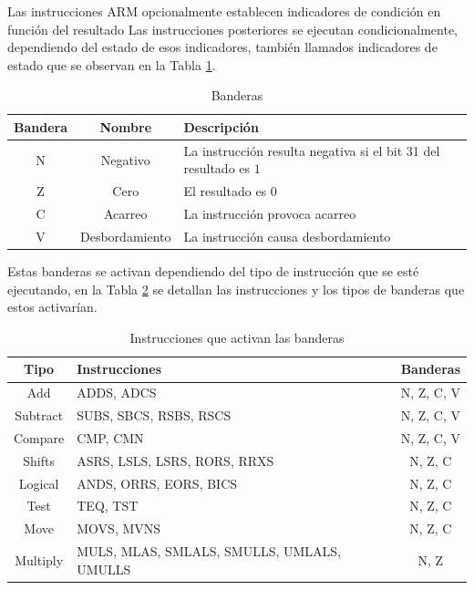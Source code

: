 \documentclass[journal,trans]{IEEEtran}
\begin{document}
	Las instrucciones ARM opcionalmente establecen indicadores de condición en función del resultado Las instrucciones posteriores se ejecutan condicionalmente, dependiendo del estado de esos indicadores, también llamados indicadores de estado que se observan en la Tabla \ref{tab:Banderas}.
	
	\begin{table}[htbp]
		\centering
		\begin{tabular}{|c|c|p{4.5cm}|}
			\hline
			Bandera & Nombre         & Descripción \\
			\hline
			\hline
			N       & Negativo       & La instrucción resulta negativa si el bit 31 del resultado es $1$ \\
			\hline
			Z       & Cero           & El resultado es 0 \\
			\hline
			C       & Acarreo        & La instrucción provoca acarreo \\
			\hline
			V       & Desbordamiento & La instrucción causa desbordamiento \\
			\hline
		\end{tabular}
		\caption{Banderas}
		\label{tab:Banderas}
	\end{table}

	Estas banderas se activan dependiendo del tipo de instrucción que se esté ejecutando, en la Tabla \ref{tab:FlagsInstructions} se detallan las instrucciones y los tipos de banderas que estos activarían. 
	
	\begin{table}[htbp]
		\centering
		\begin{tabular}{|c|p{5cm}|c|}
			\hline
			Tipo      & Instrucciones                              & Banderas   \\
			\hline
			\hline
			Add       & ADDS, ADCS                                 & N, Z, C, V \\
			\hline
			Subtract  & SUBS, SBCS, RSBS, RSCS                     & N, Z, C, V \\
			\hline
			Compare   & CMP, CMN                                   & N, Z, C, V \\
			\hline
			Shifts    & ASRS, LSLS, LSRS, RORS, RRXS               & N, Z, C    \\
			\hline
			Logical   & ANDS, ORRS, EORS, BICS                     & N, Z, C    \\
			\hline
			Test      & TEQ, TST                                   & N, Z, C    \\
			\hline
			Move      & MOVS, MVNS                                 & N, Z, C    \\
			\hline
			Multiply  & MULS, MLAS, SMLALS, SMULLS, UMLALS, UMULLS & N, Z       \\
			\hline
		\end{tabular}
		\caption{Instrucciones que activan las banderas}
		\label{tab:FlagsInstructions}
	\end{table}
	
\end{document}
